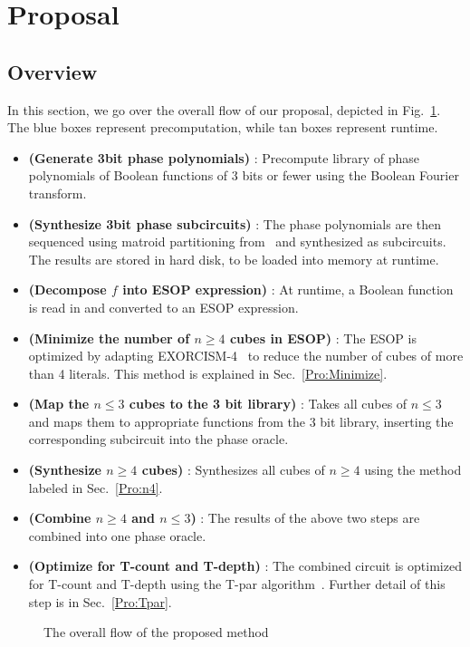 
\section{Proposal}
\label{Pro}
\subsection{Overview}

In this section, we go over the overall flow of our proposal, depicted in Fig.~\ref{fig-flow}. The blue boxes
represent precomputation, while tan boxes represent runtime.

\begin{itemize}
\item \textbf{(Generate 3bit phase polynomials)} : Precompute library of phase polynomials of Boolean functions of
  3 bits or fewer using the Boolean Fourier transform.
\item \textbf{(Synthesize 3bit phase subcircuits)} : The phase polynomials are then sequenced using matroid
  partitioning from~\cite{bib-amy-matroid} and synthesized as subcircuits. The results are stored in hard disk,
  to be loaded into memory at runtime.
\item \textbf{(Decompose $f$ into ESOP expression)} : At runtime, a Boolean function is read in and converted to
  an ESOP expression.
\item \textbf{(Minimize the number of $n \geq 4$ cubes in ESOP)} : The ESOP is optimized by adapting
  EXORCISM-4~\cite{bib-exorcism} to reduce the number of cubes of more than 4 literals. This method is explained
  in Sec.~\ref{Pro:Minimize}.
\item \textbf{(Map the $n \leq 3$ cubes to the 3 bit library)} : Takes all cubes of $n \leq 3$ and maps them to 
  appropriate functions from the 3 bit library, inserting the corresponding subcircuit into the phase oracle.
\item \textbf{(Synthesize $n \geq 4$ cubes)} : Synthesizes all cubes of $n \geq 4$ using the method labeled in
  Sec.~\ref{Pro:n4}.
\item \textbf{(Combine $n \geq 4$ and $n \leq 3$)} : The results of the above two steps are combined into one
  phase oracle.
\item \textbf{(Optimize for T-count and T-depth)} : The combined circuit is optimized for T-count and T-depth using
  the T-par algorithm~\cite{bib-amy-matroid}. Further detail of this step is in Sec.~\ref{Pro:Tpar}.
\end{itemize}
\begin{figure}[t]
  \centering
  \scalebox{1.0} {
    
  }
  \caption{The overall flow of the proposed method}
  \label{fig-flow}
  \vspace{-0.5cm}
\end{figure}

